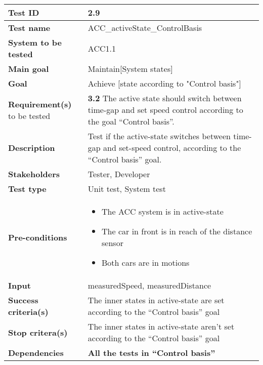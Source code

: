 	\begin{table}[H]
		\begin{tabular}{| p{4cm} | p{10cm} |}
			\hline
			\rowcolor{gray}
			{\bf Test ID} & 2.9 \\ \hline
			{\bf Test name} & ACC\_activeState\_ControlBasis\\ \hline
			{\bf System to be tested} & ACC1.1\\ \hline
			{\bf Main goal} & Maintain[System states]\\ \hline
			{\bf Goal} & Achieve [state according to "Control basis"]\\ \hline
			{\bf Requirement(s)} to be tested & {\bf 3.2} The active state should switch 
			between time-gap and set speed control according to the goal “Control basis”.
			\\ \hline
			{\bf Description} & Test if the active-state switches between time-gap and 
			set-speed control, according to the “Control basis” goal. \\ \hline
			{\bf Stakeholders} & Tester, Developer \\ \hline
			{\bf Test type} & Unit test, System test\\ \hline
			{\bf Pre-conditions} & \begin{itemize} 
			\item The ACC system is in active-state
			\item The car in front is in reach of the distance sensor
			\item Both cars are in motions 
			\end{itemize} \\ \hline
			{\bf Input} & measuredSpeed, measuredDistance \\ \hline
			{\bf Success criteria(s)} & The inner states in active-state are set according 
			to the “Control basis” goal\\ \hline
			{\bf Stop critera(s)} & The inner states in active-state aren’t set according 
			to the “Control basis” goal\\ \hline
			{\bf Dependencies} & {\bf \color{red} All the tests in “Control basis”} \\ \hline
		\end{tabular}
	\end{table}

	
